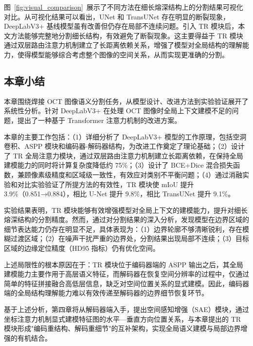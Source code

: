 图~\ref{fig:visual_comparison}~展示了不同方法在细长熔深结构上的分割结果可视化对比。从可视化结果可以看出，UNet 和 TransUNet 存在明显的断裂现象，DeepLabV3+ 基线模型虽有改善但仍存在局部不连续问题。引入 TR 模块后，本文方法能够完整地分割细长结构，有效避免了断裂现象。这主要得益于 TR 模块通过双层路由注意力机制建立了长距离依赖关系，增强了模型对全局结构的理解能力，使得模型能够综合考虑整个图像的空间关系，从而实现更准确的分割。

\subsection{本章小结}

本章围绕焊接 OCT 图像语义分割任务，从模型设计、改进方法到实验验证展开了系统性分析。针对 DeepLabV3+ 在处理 OCT 图像时全局上下文建模不足的问题，提出了一种基于 Transformer 注意力机制的改进方案。

本章的主要工作包括：（1）详细分析了 DeepLabV3+ 模型的工作原理，包括空洞卷积、ASPP 模块和编码器-解码器结构，为改进工作奠定了理论基础；（2）设计了 TR 全局注意力模块，通过双层路由注意力机制建立长距离依赖，在保持全局建模能力的同时将计算复杂度降低约 75\%；（3）设计了 BCE+Dice 混合损失函数，兼顾像素级精度和区域级一致性，有效应对类别不平衡问题；（4）通过消融实验和对比实验验证了所提方法的有效性，TR 模块使 mIoU 提升 3.9\%（0.851→0.884），相比 U-Net 提升 9.8\%，相比 TransUNet 提升 9.1\%。

实验结果表明，TR 模块能够有效增强模型对全局上下文的建模能力，提升对细长熔深结构的分割精度。然而，通过对分割结果的深入分析，发现模型在边界区域的细节表达能力仍存在明显不足，具体表现为：（1）边界轮廓不够清晰锐利，存在模糊过渡区域；（2）在噪声干扰严重的边界处，分割结果出现局部不连续；（3）目标区域的边缘定位精度（HD95 指标）仍有优化空间。

上述局限性的根本原因在于：TR 模块位于编码器端的 ASPP 输出之后，其全局建模能力主要作用于高层语义特征，而解码器在恢复空间分辨率的过程中，仅通过简单的特征拼接融合高低层信息，缺乏对空间位置关系的显式建模。因此，编码器端的全局结构理解能力难以有效传递至解码器的边界细节恢复环节。

基于上述分析，第四章将从解码器端入手，提出空间感知增强（SAE）模块，通过坐标注意力机制显式建模特征图的水平—垂直方向位置关系，与本章提出的 TR 模块形成"编码重结构、解码重细节"的互补架构，实现全局语义建模与局部边界增强的有机结合。
